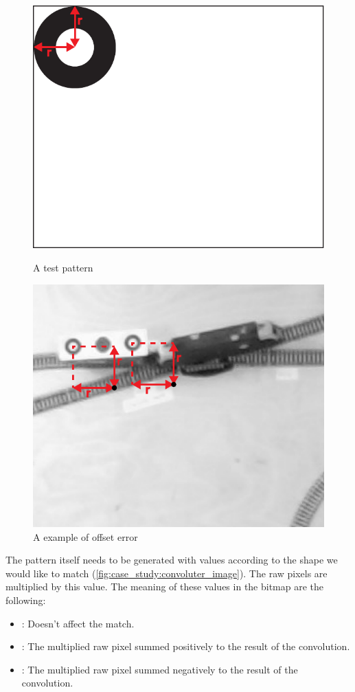 \begin{figure}[h]
	\centering
	\begin{minipage}[b]{0.49\linewidth}
		\centering
		\includegraphics[width=0.8\linewidth]{include/figures/chapter_6/math_3}
		\caption{A test pattern}
		\label{fig:case_study:offset_example}
	\end{minipage}%
	\begin{minipage}[b]{0.49\linewidth}
		\centering
		\includegraphics[width=0.8\linewidth]{include/figures/chapter_6/math_4}
		\caption{A example of offset error}
		\label{fig:case_study:offset_example}
	\end{minipage}
\end{figure}

The pattern itself needs to be generated with values according to the shape we would like to match (\cref{fig:case_study:convoluter_image}). The raw pixels are multiplied by this value. The meaning of these values in the bitmap are the following: 
\begin{itemize}
	\item {}: Doesn't affect the match.
	\item {}: The multiplied raw pixel summed positively to the result of the convolution.
	\item {}: The multiplied raw pixel summed negatively to the result of the convolution.
\end{itemize}

